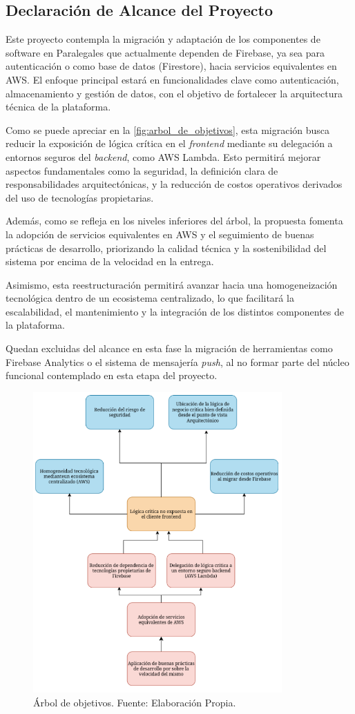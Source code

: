 \subsection{Declaración de Alcance del Proyecto}

Este proyecto contempla la migración y adaptación de los componentes de software en Paralegales que actualmente dependen de Firebase, ya sea para autenticación o como base de datos (Firestore), hacia servicios equivalentes en AWS. El enfoque principal estará en funcionalidades clave como autenticación, almacenamiento y gestión de datos, con el objetivo de fortalecer la arquitectura técnica de la plataforma.

Como se puede apreciar en la \autoref{fig:arbol_de_objetivos}, esta migración busca reducir la exposición de lógica crítica en el \textit{frontend} mediante su delegación a entornos seguros del \textit{backend}, como AWS Lambda. Esto permitirá mejorar aspectos fundamentales como la seguridad, la definición clara de responsabilidades arquitectónicas, y la reducción de costos operativos derivados del uso de tecnologías propietarias.

Además, como se refleja en los niveles inferiores del árbol, la propuesta fomenta la adopción de servicios equivalentes en AWS y el seguimiento de buenas prácticas de desarrollo, priorizando la calidad técnica y la sostenibilidad del sistema por encima de la velocidad en la entrega.

Asimismo, esta reestructuración permitirá avanzar hacia una homogeneización tecnológica dentro de un ecosistema centralizado, lo que facilitará la escalabilidad, el mantenimiento y la integración de los distintos componentes de la plataforma.

Quedan excluidas del alcance en esta fase la migración de herramientas como Firebase Analytics o el sistema de mensajería \textit{push}, al no formar parte del núcleo funcional contemplado en esta etapa del proyecto.

\begin{figure}[H]
  \centering
  \includegraphics[width=0.85\textwidth]{img/figures/fig7-arbol-de-objetivos.png}
  \caption{Árbol de objetivos. Fuente: Elaboración Propia.}
  \label{fig:arbol_de_objetivos}
\end{figure}